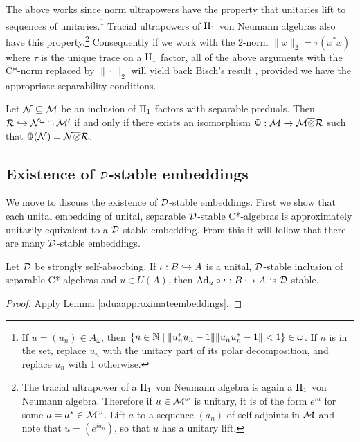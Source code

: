 \documentclass[12pt]{amsart}
\begin{document}
    The above works since norm ultrapowers have the property that unitaries lift to sequences of unitaries.\footnote{If $u = (u_n) \in A_\omega$, then $\{n \in \mathbb{N} \mid \|u_n^*u_n - 1\|\|u_nu_n^* - 1\| < 1\} \in \omega$. If $n$ is in the set, replace $u_n$ with the unitary part of its polar decomposition, and replace $u_n$ with 1 otherwise.} Tracial ultrapowers of $\text{II}_1$ von Neumann algebras also have this property.\footnote{The tracial ultrapower of a $\text{II}_1$ von Neumann algebra is again a $\text{II}_1$ von Neumann algebra. Therefore if $u \in \mathcal{M}^\omega$ is unitary, it is of the form $e^{ia}$ for some $a = a^* \in \mathcal{M}^\omega$. Lift $a$ to a sequence $(a_n)$ of self-adjoints in $\mathcal{M}$ and note that $u = (e^{ia_n})$, so that $u$ has a unitary lift.} Consequently if we work with the 2-norm $\|x\|_2 = \tau(x^*x)$ where $\tau$ is the unique trace on a $\text{II}_1$ factor, all of the above arguments with the C*-norm replaced by $\|\cdot\|_2$ will yield back Bisch's result \cite[Theorem 3.1]{Bisch90}, provided we have the appropriate separability conditions. 

    \begin{theorem}
      Let $\mathcal{N} \subseteq \mathcal{M}$ be an inclusion of $\text{II}_1$ factors with separable preduals. Then $\mathcal{R} \hookrightarrow \mathcal{N}^\omega \cap \mathcal{M}'$ if and only if there exists an isomorphism $\Phi: \mathcal{M} \to \mathcal{M} \overline{\otimes} \mathcal{R}$ such that $\Phi(\mathcal{N}) = \mathcal{N} \overline{\otimes} \mathcal{R}$.
      \end{theorem}

  \subsection{Existence of $\mathcal{D}$-stable embeddings}\label{ssection:dse-existence}

  We move to discuss the existence of $\mathcal{D}$-stable embeddings. First we show that each unital embedding of unital, separable $\mathcal{D}$-stable C*-algebras is approximately unitarily equivalent to a $\mathcal{D}$-stable embedding. From this it will follow that there are many $\mathcal{D}$-stable embeddings. 

  \begin{lemma}\label{adudstable}
      Let $\mathcal{D}$ be strongly self-absorbing. If $\iota: B \hookrightarrow A$ is a unital, $\mathcal{D}$-stable inclusion of separable C*-algebras and $u \in U(A)$, then $\text{Ad}_u \circ \iota: B \hookrightarrow A$ is $\mathcal{D}$-stable.
        \begin{proof}
          Apply Lemma \ref{aduaapproximateembeddings}. 
        \end{proof}
    \end{lemma}
\end{document}
